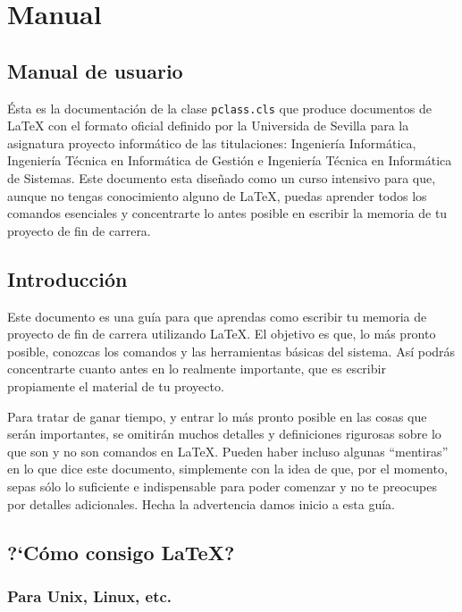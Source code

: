 \chapter{Manual}\label{manual}

\section{Manual de usuario}

\'Esta es la documentaci\'on de la clase \texttt{pclass.cls} que produce
documentos de \LaTeX{} con el formato oficial definido por la Universida de Sevilla para la asignatura proyecto 
inform\'atico de las titulaciones: Ingenier\'ia Inform\'atica, Ingenier\'ia T\'ecnica en Inform\'atica de Gesti\'on e Ingenier\'ia T\'ecnica en Inform\'atica de Sistemas. Este documento esta dise\~nado como un curso intensivo
para que, aunque  no tengas conocimiento alguno de \LaTeX{}, puedas aprender todos los comandos esenciales y concentrarte 
lo antes posible en escribir la  memoria de tu proyecto de fin de carrera.



\section{Introducci\'on}

Este documento es una gu\'ia para que aprendas como escribir tu memoria de proyecto de fin de carrera utilizando \LaTeX{}. 
El objetivo es que, lo m\'as pronto posible, conozcas los comandos y las herramientas b\'asicas
del sistema. As\'i podr\'as concentrarte cuanto antes en lo realmente 
importante, que es escribir propiamente el material de tu proyecto.

Para tratar de ganar tiempo, y entrar lo m\'as pronto posible en las cosas
que ser\'an importantes, se omitir\'an muchos detalles y definiciones
rigurosas sobre lo que son y no son comandos en \LaTeX{}. Pueden haber incluso
algunas ``mentiras'' en lo que dice este documento, simplemente con la idea de que, 
por el momento, sepas s\'olo lo suficiente e indispensable para poder comenzar y
no te preocupes por detalles adicionales. Hecha la advertencia damos inicio a esta gu\'ia.



\section{?`C\'omo consigo \LaTeX{}?}


\subsection{Para Unix, Linux, etc.}

